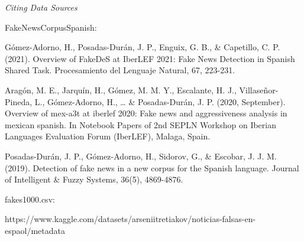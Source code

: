 \documentclass[11pt]{article}
\begin{document}
    \emph{Citing Data Sources}

FakeNewsCorpusSpanish:

Gómez-Adorno, H., Posadas-Durán, J. P., Enguix, G. B., \& Capetillo, C.
P. (2021). Overview of FakeDeS at IberLEF 2021: Fake News Detection in
Spanish Shared Task. Procesamiento del Lenguaje Natural, 67, 223-231.

Aragón, M. E., Jarquín, H., Gómez, M. M. Y., Escalante, H. J.,
Villaseñor-Pineda, L., Gómez-Adorno, H., \ldots{} \& Posadas-Durán, J.
P. (2020, September). Overview of mex-a3t at iberlef 2020: Fake news and
aggressiveness analysis in mexican spanish. In Notebook Papers of 2nd
SEPLN Workshop on Iberian Languages Evaluation Forum (IberLEF), Malaga,
Spain.

Posadas-Durán, J. P., Gómez-Adorno, H., Sidorov, G., \& Escobar, J. J.
M. (2019). Detection of fake news in a new corpus for the Spanish
language. Journal of Intelligent \& Fuzzy Systems, 36(5), 4869-4876.

fakes1000.csv:

https://www.kaggle.com/datasets/arseniitretiakov/noticias-falsas-en-espaol/metadata


    
    
    
\end{document}
